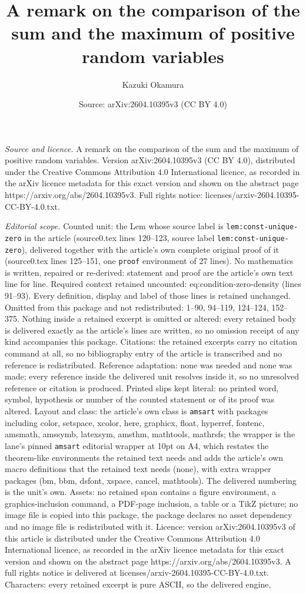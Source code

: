 \documentclass[10pt,a4paper]{amsart}
\title[A remark on the comparison of the sum and the maximum of pos]{A remark on the comparison of the sum and the maximum of positive random variables}
\author{Kazuki Okamura}
\date{Source: arXiv:2604.10395v3 (CC BY 4.0)}
\begin{document}
\maketitle

\noindent\emph{Source and licence.} A remark on the comparison of the sum and the maximum of positive random variables. Version arXiv:2604.10395v3 (CC BY 4.0), distributed under the Creative Commons Attribution 4.0 International licence, as recorded in the arXiv licence metadata for this exact version and shown on the abstract page https://arxiv.org/abs/2604.10395v3. Full rights notice: licenses/arxiv-2604.10395-CC-BY-4.0.txt.\par\smallskip

\noindent\textit{Editorial scope.} Counted unit: the Lem whose source label is \texttt{lem:const-unique-zero} in the article (source0.tex lines 120--123, source label \texttt{lem:const-unique-zero}), delivered together with the article's own complete original proof of it (source0.tex lines 125--151, one \texttt{proof} environment of 27 lines). No mathematics is written, repaired or re-derived: statement and proof are the article's own text line for line. Required context retained uncounted: eq:condition-zero-density (lines 91--93). Every definition, display and label of those lines is retained unchanged. Omitted from this package and not redistributed: 1--90, 94--119, 124--124, 152--375. Nothing inside a retained excerpt is omitted or altered: every retained body is delivered exactly as the article's lines are written, so no omission receipt of any kind accompanies this package. Citations: the retained excerpts carry no citation command at all, so no bibliography entry of the article is transcribed and no reference is redistributed. Reference adaptation: none was needed and none was made; every reference inside the delivered unit resolves inside it, so no unresolved reference or citation is produced. Printed slips kept literal: no printed word, symbol, hypothesis or number of the counted statement or of its proof was altered. Layout and class: the article's own class is \texttt{amsart} with packages including color, setspace, xcolor, here, graphicx, float, hyperref, fontenc, amsmath, amssymb, latexsym, amsthm, mathtools, mathrsfs; the wrapper is the lane's pinned \texttt{amsart} editorial wrapper at 10pt on A4, which restates the theorem-like environments the retained text needs and adds the article's own macro definitions that the retained text needs (none), with extra wrapper packages (bm, bbm, dsfont, xspace, cancel, mathtools). The delivered numbering is the unit's own. Assets: no retained span contains a figure environment, a graphics-inclusion command, a PDF-page inclusion, a table or a TikZ picture; no image file is copied into this package, the package declares no asset dependency and no image file is redistributed with it. Licence: version arXiv:2604.10395v3 of this article is distributed under the Creative Commons Attribution 4.0 International licence, as recorded in the arXiv licence metadata for this exact version and shown on the abstract page https://arxiv.org/abs/2604.10395v3. A full rights notice is delivered at licenses/arxiv-2604.10395-CC-BY-4.0.txt. Characters: every retained excerpt is pure ASCII, so the delivered engine, 
\end{document}
